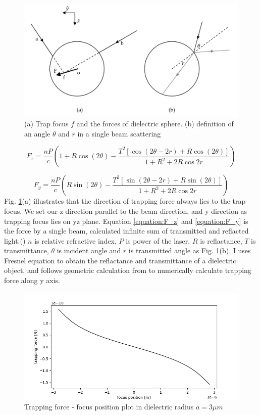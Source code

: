 \documentclass{article}
\begin{document}
\begin{figure}[h]
    \centering
    \includegraphics[width=0.8\linewidth]{../results/Optical_tweezer_illust.png}
    \caption{(a) Trap focus $f$ and the forces of dielectric sphere. (b) definition of an angle $\theta$ and $r$ in a single beam scattering}
    \label{Figure:Optical tweezer}
\end{figure}

\begin{equation}
    F_z = \frac{nP}{c} ( 1+ R \cos(2 \theta) - \frac{T^2 [\cos(2 \theta - 2r) + R \cos(2\theta)]}{1+R^2 + 2R \cos 2r} )
    \label{equation:F_z}
\end{equation}

\begin{equation}
    F_y = \frac{nP}{c} (R \sin(2 \theta) - \frac{T^2 [\sin(2 \theta - 2r) + R \sin(2\theta)]}{1+R^2 + 2R \cos 2r} )
    \label{equation:F_y}
\end{equation}
Fig. \ref{Figure:Optical tweezer}(a) illustrates that the direction of trapping force always lies to the trap focus.
We set our z direction parallel to the beam direction, and y direction as trapping focus lies on yz plane.
Equation \ref{equation:F_z} and \ref{equation:F_y} is the force by a single beam, calculated infinite sum of transmitted and reflacted light.(\cite{single_beam})
$n$ is relative refractive index, $P$ is power of the laser, $R$ is reflactance, $T$ is transmittance, $\theta$ is incident angle and $r$ is transmitted angle as Fig. \ref{Figure:Optical tweezer}(b).
I uses Fresnel equation to obtain the reflactance and transmittance of a dielectric object, and follows geometric calculation from \cite{single_beam} to numerically calculate trapping force along y axis.

\begin{figure}[t]
    \centering
    \includegraphics[width=0.8\linewidth]{../results/Optical_tweezer_intro_fig.png}
    \caption{Trapping force - focus position plot in dielectric radius $a = 3\mu m$}
    \label{Figure:Optical tweezer force}
\end{figure}
\end{document}

